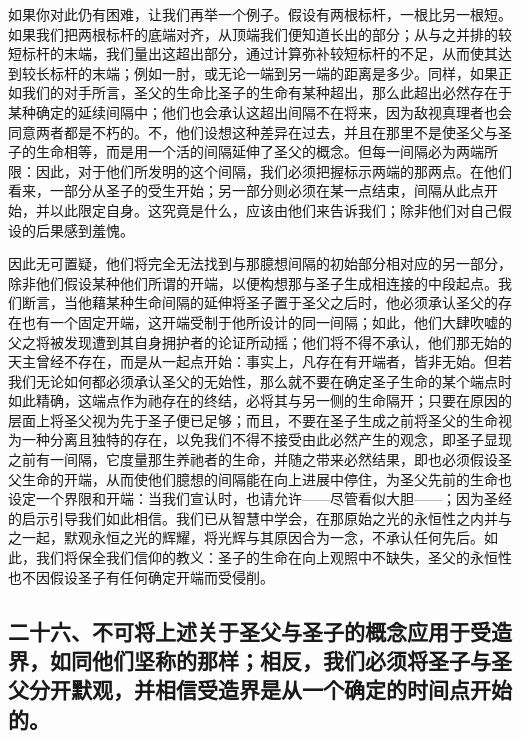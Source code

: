 如果你对此仍有困难，让我们再举一个例子。假设有两根标杆，一根比另一根短。如果我们把两根标杆的底端对齐，从顶端我们便知道长出的部分；从与之并排的较短标杆的末端，我们量出这超出部分，通过计算弥补较短标杆的不足，从而使其达到较长标杆的末端；例如一肘，或无论一端到另一端的距离是多少。同样，如果正如我们的对手所言，圣父的生命比圣子的生命有某种超出，那么此超出必然存在于某种确定的延续间隔中；他们也会承认这超出间隔不在将来，因为敌视真理者也会同意两者都是不朽的。不，他们设想这种差异在过去，并且在那里不是使圣父与圣子的生命相等，而是用一个活的间隔延伸了圣父的概念。但每一间隔必为两端所限：因此，对于他们所发明的这个间隔，我们必须把握标示两端的那两点。在他们看来，一部分从圣子的受生开始；另一部分则必须在某一点结束，间隔从此点开始，并以此限定自身。这究竟是什么，应该由他们来告诉我们；除非他们对自己假设的后果感到羞愧。\par

因此无可置疑，他们将完全无法找到与那臆想间隔的初始部分相对应的另一部分，除非他们假设某种他们所谓的开端，以便构想那与圣子生成相连接的中段起点。我们断言，当他藉某种生命间隔的延伸将圣子置于圣父之后时，他必须承认圣父的存在也有一个固定开端，这开端受制于他所设计的同一间隔；如此，他们大肆吹嘘的父之将被发现遭到其自身拥护者的论证所动摇；他们将不得不承认，他们那无始的天主曾经不存在，而是从一起点开始：事实上，凡存在有开端者，皆非无始。但若我们无论如何都必须承认圣父的无始性，那么就不要在确定圣子生命的某个端点时如此精确，这端点作为祂存在的终结，必将其与另一侧的生命隔开；只要在原因的层面上将圣父视为先于圣子便已足够；而且，不要在圣子生成之前将圣父的生命视为一种分离且独特的存在，以免我们不得不接受由此必然产生的观念，即圣子显现之前有一间隔，它度量那生养祂者的生命，并随之带来必然结果，即也必须假设圣父生命的开端，从而使他们臆想的间隔能在向上进展中停住，为圣父先前的生命也设定一个界限和开端：当我们宣认时，也请允许——尽管看似大胆——；因为圣经的启示引导我们如此相信。我们已从智慧中学会，在那原始之光的永恒性之内并与之一起，默观永恒之光的辉耀，将光辉与其原因合为一念，不承认任何先后。如此，我们将保全我们信仰的教义：圣子的生命在向上观照中不缺失，圣父的永恒性也不因假设圣子有任何确定开端而受侵削。\par


\subsection{二十六、不可将上述关于圣父与圣子的概念应用于受造界，如同他们坚称的那样；相反，我们必须将圣子与圣父分开默观，并相信受造界是从一个确定的时间点开始的。}

